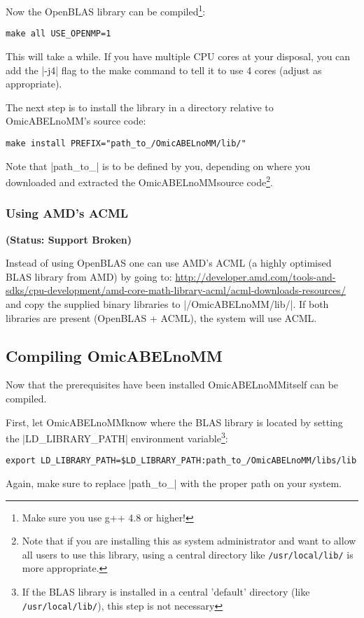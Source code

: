 \documentclass{report}
\newcommand{\oanomm}{OmicABELnoMM}
\begin{document}
Now the OpenBLAS library can be compiled\footnote{Make sure you use
  g++ 4.8 or higher!}:
\begin{lstlisting}[escapechar=\%]
make all USE_OPENMP=1
\end{lstlisting}
This will take a while. If you have multiple CPU cores at your
disposal, you can add the |-j4| flag to the make command to tell it to
use 4 cores (adjust as appropriate).

The next step is to install the library in a directory relative to
OmicABELnoMM's source code:
\begin{lstlisting}
make install PREFIX="path_to_/OmicABELnoMM/lib/"
\end{lstlisting}
Note that |path_to_| is to be defined by you, depending on where you
downloaded and extracted the \oanomm source code\footnote{Note that if
you are installing this as system administrator and want to allow all
users to use this library, using a central directory like
\lstinline{/usr/local/lib/} is more appropriate.}.

\subsubsection{Using AMD's ACML}
\textbf{(Status: Support Broken)}

Instead of using OpenBLAS one can use AMD's ACML (a highly optimised
\ac{BLAS} library from AMD) by going to:
\url{http://developer.amd.com/tools-and-sdks/cpu-development/amd-core-math-library-acml/acml-downloads-resources/}
and copy the supplied binary libraries to |/OmicABELnoMM/lib/|. If
both libraries are present (OpenBLAS + ACML), the system will use
ACML.


\subsection{Compiling \oanomm}
\label{sec:compiling-oanomm}
Now that the prerequisites have been installed \oanomm itself can be compiled.

First, let \oanomm know where the \ac{BLAS} library is located by
setting the |LD_LIBRARY_PATH| environment variable\footnote{If the
  \ac{BLAS} library is installed in a central 'default' directory
  (like \lstinline{/usr/local/lib/}), this step is not necessary}:
\begin{lstlisting}[escapechar=\%]
export LD_LIBRARY_PATH=$LD_LIBRARY_PATH:path_to_/OmicABELnoMM/libs/lib
\end{lstlisting}
Again, make sure to replace |path_to_| with the proper path on your system.
\end{document}
